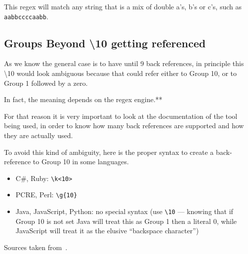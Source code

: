 This regex will match any string that is a mix of double a's, b's or c's, such
as \verb|aabbccccaabb|.



\subsection{Groups Beyond \textbackslash{}10 getting referenced}

As we know the general case is to have until 9 back references, in principle
this \textbackslash{}10 would look ambiguous because that could refer either to Group 10, or to Group 1 followed by a zero.

In fact, the meaning depends on the regex engine.**

For that reason it is very important to look at the documentation of the tool being used, in order to know how many back references are supported and how they are actually used.

To avoid this kind of ambiguity, here is the proper syntax to create a back-reference to Group 10 in some languages.

\begin{itemize}
    \item C\#, Ruby: \verb|\k<10>|
    \item PCRE, Perl: \verb|\g{10}|
    \item Java, JavaScript, Python: no special syntax (use \verb|\10| ---
        knowing that if Group 10 is not set Java will treat this as Group 1 then
        a literal 0, while JavaScript will treat it as the elusive ``backspace
        character'')
\end{itemize}

Sources taken from~\autocites{rexegg}{regex}.

